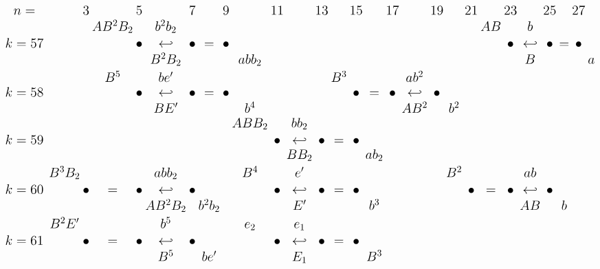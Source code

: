 \documentclass{article}
\begin{document}
\(
\begin{tikzcd}[
nodes={font=\Large,inner sep=0pt},
row sep=0.2cm,
column sep=0.1cm
]
n=& && 3 & & 5 & & 7 & & 9 & & 11 & & 13 & & 15 & & 17 & & 19 & & 21 & & 23 && 25 && 27 \\
 && && AB^2B_2 && b^2b_2 && && && && && && && && AB && b \\
k=57& && && \bullet & \hookleftarrow & \bullet &=& \bullet && && && && && && && \bullet & \hookleftarrow & \bullet &=& \bullet \\
& & && && B^2B_2 && && abb_2 && && && && && && && B && && a \\
&& && B^5 && be' && && && && B^3 && && ab^2 \\
k=58& && && \bullet & \hookleftarrow & \bullet &=& \bullet && && && \bullet &=& \bullet &\hookleftarrow& \bullet \\
& & && && BE' && && b^4 && && && && AB^2 && b^2 \\ 
&& && && && && ABB_2 && bb_2 \\
k=59& && && && && && \bullet & \hookleftarrow & \bullet &=& \bullet \\
& & && && && && && BB_2 && && ab_2 \\
&& B^3B_2 && && abb_2 && && B^4 && e' && && && && B^2 && && ab \\
k=60& && \bullet &=& \bullet &\hookleftarrow& \bullet && && \bullet & \hookleftarrow & \bullet & = & \bullet && && && \bullet &=& \bullet &\hookleftarrow& \bullet  \\
&& && && AB^2B_2 && b^2b_2 && && E' && && b^3 && && && && AB && b \\ 
&& B^2E' && && b^5 && && e_2 && e_1 && && && && \\
k=61& && \bullet &=& \bullet &\hookleftarrow& \bullet && && \bullet & \hookleftarrow & \bullet & = & \bullet \\
&& && && B^5 && be' && && E_1 && && B^3 && && \\
\end{tikzcd}
\)
\end{document}
